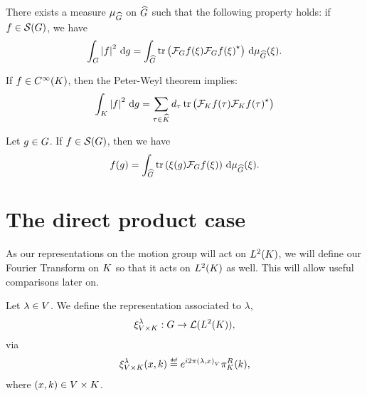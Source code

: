\begin{proposition}
    There exists a measure $\Plancherel\Group$ on $\dualGroup\Group$ such that the following property holds:
    if $f \in \Schwartz\Group$, we have
    \begin{align*}
        \int_\Group \abs{f}^2 \dd g
        = \int_{\dualGroup\Group} \tr \left( \Fourier f(\xi) \adj{\Fourier f(\xi)} \right) \dd \Plancherel\Group(\xi).
    \end{align*}
\end{proposition}

\begin{example}
    If $f \in \SmoothFunctions{\CompactGroup}$,
    then the Peter-Weyl theorem implies:
    \begin{align*}
        \int_\CompactGroup \abs{f}^2 \dd g
        = \sum_{\tau \in \dualGroup\CompactGroup}
            \dimRep\tau
            \tr \left(
                \Fourier[\CompactGroup] f(\tau)
                \adj{\Fourier[\CompactGroup] f(\tau)}
            \right)
    \end{align*}
\end{example}

\begin{proposition}
    Let $g \in \Group$.
    If $f \in \Schwartz\Group$,
    then we have
    \begin{align*}
        f(g) =
        \int_\dualGroup\Group
            \tr\left(
                \xi(g)
                \Fourier f(\xi)
            \right)
        \dd \Plancherel\Group(\xi).
    \end{align*}
\end{proposition}

\section{The direct product case} 

As our representations on the motion group will act on $\Lebesgue{2}\CompactGroup$,
we will define our Fourier Transform on $\CompactGroup$ so that it acts on $\Lebesgue{2}\CompactGroup$ as well.
This will allow useful comparisons later on.

\begin{definition}
    Let $\lambda \in \VectorSpace$.
    We define the representation associated to $\lambda$,
    \begin{align*}
        \Rep [\GroupDirect] \lambda : \Group \to \Lin{\Lebesgue 2 \CompactGroup},
    \end{align*}
    via
    \begin{align*}
        \Rep [\GroupDirect] \lambda (x, k) \defeq \e^{\i \turn \ip \lambda x} \RightRegularRepresentation (k),
    \end{align*}
    where $(x, k) \in \GroupDirect$.
\end{definition}

